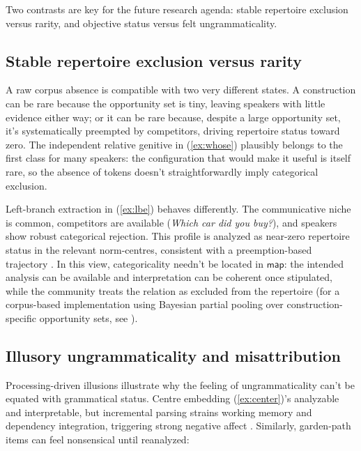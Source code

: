 \documentclass[12pt,letterpaper]{article}
\newcommand{\mention}[1]{\textit{#1}}
\begin{document}
Two contrasts are key for the future research agenda: stable repertoire exclusion versus rarity, and objective status versus felt ungrammaticality.

\subsection{Stable repertoire exclusion versus rarity}

A raw corpus absence is compatible with two very different states. A construction can be rare because the opportunity set is tiny, leaving speakers with little evidence either way; or it can be rare because, despite a large opportunity set, it's systematically preempted by competitors, driving repertoire status toward zero. The independent relative genitive in (\ref{ex:whose}) plausibly belongs to the first class for many speakers: the configuration that would make it useful is itself rare, so the absence of tokens doesn't straightforwardly imply categorical exclusion.

\begin{sloppypar}
Left-branch extraction in (\ref{ex:lbe}) behaves differently. The communicative niche is common, competitors are available (\mention{Which car did you buy?}), and speakers show robust categorical rejection. This profile is analyzed as near-zero repertoire status in the relevant norm-centres, consistent with a preemption-based trajectory \autocite{Goldberg2011}. In this view, categoricality needn't be located in $\mathsf{map}$: the intended analysis can be available and interpretation can be coherent once stipulated, while the community treats the relation as excluded from the repertoire (for a corpus-based implementation using Bayesian partial pooling over construction-specific opportunity sets, see \citealt{reynolds2026lbe}).
\end{sloppypar}

\subsection{Illusory ungrammaticality and misattribution}

Processing-driven illusions illustrate why the feeling of ungrammaticality can't be equated with grammatical status. Centre embedding (\ref{ex:center})'s analyzable and interpretable, but incremental parsing strains working memory and dependency integration, triggering strong negative affect \autocite{gibson2025}. Similarly, garden-path items can feel nonsensical until reanalyzed:
\end{document}
